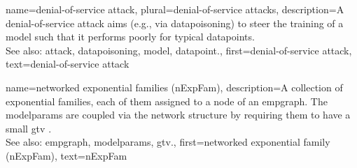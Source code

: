 {name={denial-of-service attack}, plural={denial-of-service attacks},
	description={A 
		denial-of-service \gls{attack} aims (e.g., via \gls{datapoisoning}) to steer the training of a \gls{model} 
		such that it performs poorly for typical \glspl{datapoint}.
				\\
		See also: \gls{attack}, \gls{datapoisoning}, \gls{model}, \gls{datapoint}.},
	first={denial-of-service attack},
	text={denial-of-service attack} 
}

{name={networked exponential families (nExpFam)}, 
	description={A collection of exponential 
		families, each of them assigned to a node of an \gls{empgraph}. The \glspl{modelparam} are coupled 
	   	via the network structure by requiring them to have a small \gls{gtv} \cite{JungNetExp2020}.
	   		\\
		See also: \gls{empgraph}, \glspl{modelparam}, \gls{gtv}.},
	first={networked exponential family (nExpFam)},
	text={nExpFam} 
}
	 

